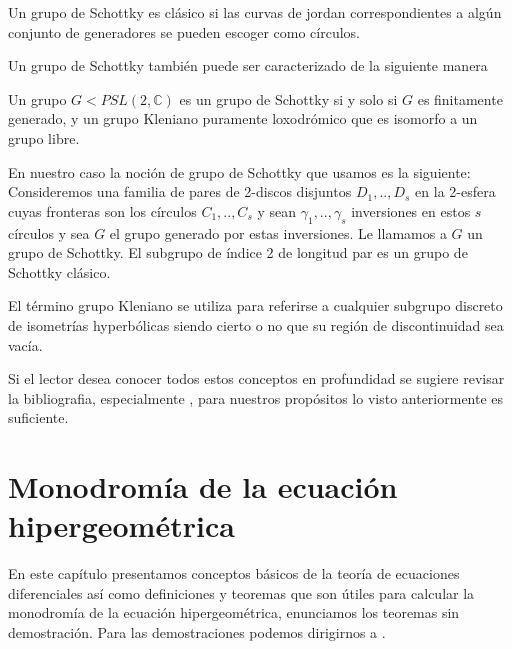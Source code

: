 Un grupo de Schottky es cl\'asico si las curvas de jordan correspondientes a alg\'un conjunto de generadores se pueden escoger como c\'irculos.

Un grupo de Schottky tambi\'en puede ser caracterizado de la siguiente manera

\begin{thm}
Un grupo $G < PSL(2,\mathbb{C})$ es un grupo de Schottky si y solo si $G$ es finitamente generado, y un grupo Kleniano puramente loxodr\'omico que es isomorfo a un grupo libre.
\end{thm}

En nuestro caso la noci\'on de grupo de Schottky que usamos es la siguiente: Consideremos una familia de pares de 2-discos disjuntos $D_{1},..,D_{s}$ en la 2-esfera cuyas fronteras son los c\'irculos $C_{1},..,C_{s}$ y sean $\gamma_{1},..,\gamma_{s}$ inversiones en estos $s$ c\'irculos y sea $G$ el grupo generado por estas inversiones. Le llamamos a $G$ un grupo de Schottky. El subgrupo de \'indice 2 de longitud par es un grupo de Schottky cl\'asico.

El t\'ermino grupo Kleniano se utiliza para referirse a cualquier subgrupo discreto de isometr\'ias hyperb\'olicas siendo cierto o no que su regi\'on de discontinuidad sea vac\'ia.

Si el lector desea conocer todos estos conceptos en profundidad se sugiere revisar la bibliografia, especialmente \cite{Kleniangroups}, para nuestros prop\'ositos lo visto anteriormente es suficiente.


\section{Monodrom\'ia de la ecuaci\'on hipergeom\'etrica}
\label{cha:State of the Art}





En este cap\'itulo presentamos conceptos b\'asicos de la teor\'ia de ecuaciones diferenciales as\'i como definiciones y teoremas que son \'utiles para calcular la monodrom\'ia de la ecuaci\'on hipergeom\'etrica, enunciamos los teoremas sin demostraci\'on. Para las demostraciones podemos dirigirnos a \cite{gausspainleve}. \\

